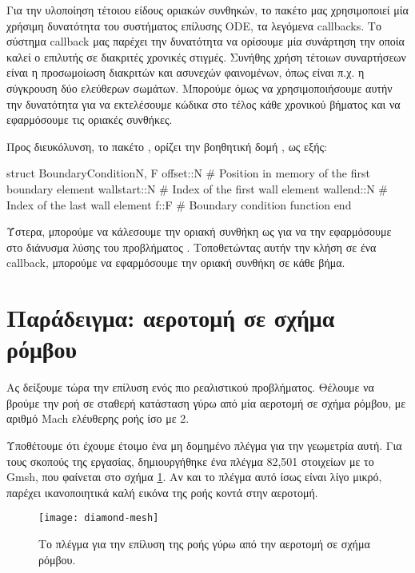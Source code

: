 Για την υλοποίηση τέτοιου είδους οριακών συνθηκών, το πακέτο μας χρησιμοποιεί μία χρήσιμη δυνατότητα του συστήματος επίλυσης ODE, τα λεγόμενα callbacks.
Το σύστημα callback μας παρέχει την δυνατότητα να ορίσουμε μία συνάρτηση την οποία καλεί ο επιλυτής σε διακριτές χρονικές στιγμές.
Συνήθης χρήση τέτοιων συναρτήσεων είναι η προσωμοίωση διακριτών και ασυνεχών φαινομένων, όπως είναι π.χ. η σύγκρουση δύο ελεύθερων σωμάτων.
Μπορούμε όμως να χρησιμοποιήσουμε αυτήν την δυνατότητα για να εκτελέσουμε κώδικα στο τέλος κάθε χρονικού βήματος και να εφαρμόσουμε τις οριακές συνθήκες.

Προς διευκόλυνση, το πακέτο , ορίζει την βοηθητική δομή , ως εξής:

{\large
\begin{jllisting}[language=julia,style=jlcodestyle]
struct BoundaryCondition{N, F}
    offset::N    # Position in memory of the first boundary element
    wallstart::N # Index of the first wall element
    wallend::N   # Index of the last wall element
    f::F         # Boundary condition function
end
\end{jllisting}
}

Ύστερα, μπορούμε να κάλεσουμε την οριακή συνθήκη ως  για να την εφαρμόσουμε στο διάνυσμα λύσης  του προβλήματος .
Τοποθετώντας αυτήν την κλήση σε ένα callback, μπορούμε να εφαρμόσουμε την οριακή συνθήκη σε κάθε βήμα.

\section{Παράδειγμα: αεροτομή σε σχήμα ρόμβου}

Ας δείξουμε τώρα την επίλυση ενός πιο ρεαλιστικού προβλήματος.
Θέλουμε να βρούμε την ροή σε σταθερή κατάσταση γύρω από μία αεροτομή σε σχήμα ρόμβου, με αριθμό Mach ελέυθερης ροής ίσο με 2.

Υποθέτουμε ότι έχουμε έτοιμο ένα μη δομημένο πλέγμα για την γεωμετρία αυτή.
Για τους σκοπούς της εργασίας, δημιουργήθηκε ένα πλέγμα 82,501 στοιχείων με το Gmsh, που φαίνεται στο σχήμα \ref{fig:mesh-diamond}.
Αν και το πλέγμα αυτό ίσως είναι λίγο μικρό, παρέχει ικανοποιητικά καλή εικόνα της ροής κοντά στην αεροτομή.

\begin{figure}[H]
    \centering
    \texttt{[image: diamond-mesh]}
    \caption{Το πλέγμα για την επίλυση της ροής γύρω από την αεροτομή σε σχήμα ρόμβου.}
    \label{fig:mesh-diamond}
\end{figure}

